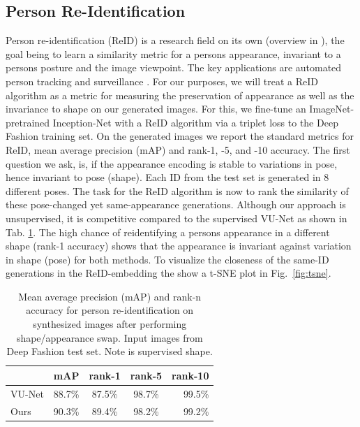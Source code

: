 	\subsection{Person Re-Identification}
		Person re-identification (ReID) is a research field on its own (overview in \eg \cite{almazan18reidtowards, bedagkar14reidtrends}), the goal being to learn a similarity metric for a persons appearance, invariant to a persons posture and the image viewpoint.
		The key applications are automated person tracking and surveillance \cite{zheng16reidfuture}.
		For our purposes, we will treat a ReID algorithm as a metric for measuring the preservation of appearance as well as the invariance to shape on our generated images.
		For this, we fine-tune an ImageNet-pretrained \cite{russakovsky15imagenet} Inception-Net \cite{szegedy15inception} with a ReID algorithm \cite{xiao17reidjoint} via a triplet loss \cite{hermans17reidtriplet} to the Deep Fashion training set.
		On the generated images we report the standard metrics for ReID, mean average precision (mAP) and rank-1, -5, and -10 accuracy.
		The first question we ask, is, if the appearance encoding is stable to variations in pose, hence invariant to pose (shape). Each ID from the test set is generated in 8 different poses. The task for the ReID algorithm is now to rank the similarity of these pose-changed yet same-appearance generations.
		Although our approach is unsupervised, it is competitive compared to the supervised VU-Net \cite{esser18} as shown in Tab. \ref{tab:reid}. The high chance of reidentifying a persons appearance in a different shape (rank-1 accuracy) shows that the appearance is invariant against variation in shape (pose) for both methods.
 		To visualize the closeness of the same-ID generations in the ReID-embedding the show a t-SNE plot in Fig.~\ref{fig:tsne}.

		\begin{table}[htp]
			\centering
			\caption{Mean average precision (mAP) and rank-n accuracy for person re-identification on synthesized images after performing shape/appearance swap. Input images from Deep Fashion test set. Note \cite{esser18} is supervised \wrt shape.}
			\label{tab:reid}
			\begin{tabular}{l|cccr}
				\hline
				& mAP & rank-1 & rank-5 & rank-10 \\ \hline
				VU-Net \cite{esser18} & 88.7\% & 87.5\% & {98.7}\% & {99.5}\% \\
				Ours & {90.3}\% & {89.4}\% &{98.2}\% & {99.2}\% \\ \hline
			\end{tabular}
		\end{table}


